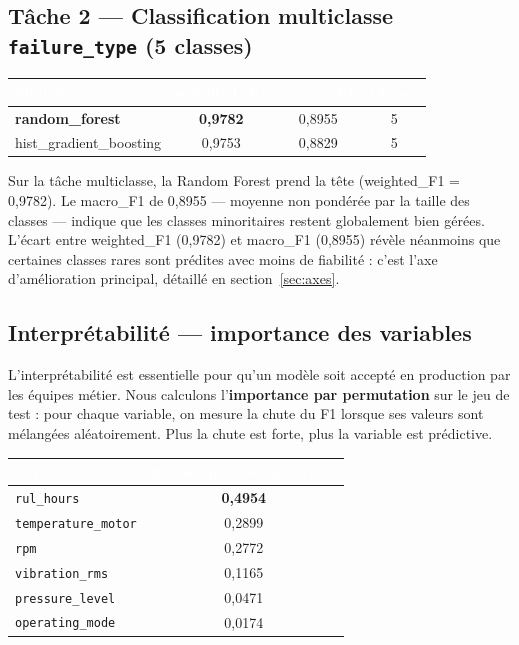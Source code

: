 \documentclass[11pt]{article}
\newcommand{\thead}[1]{\textbf{\textcolor{white}{#1}}}
\begin{document}
\subsection{Tâche 2 --- Classification multiclasse \texttt{failure\_type} (5 classes)}

\begin{center}
\begin{tabularx}{\linewidth}{|>{\raggedright\arraybackslash}X|c|c|c|}
\hline
\rowcolor{tableHeader}
\thead{Modèle} & \thead{weighted\_F1} & \thead{macro\_F1} & \thead{Classes} \\
\hline
\textbf{random\_forest} & \textbf{0,9782} & 0,8955 & 5 \\
\hline
hist\_gradient\_boosting & 0,9753 & 0,8829 & 5 \\
\hline
\end{tabularx}
\end{center}

Sur la tâche multiclasse, la Random Forest prend la tête (weighted\_F1 = 0,9782).
Le macro\_F1 de 0,8955 --- moyenne non pondérée par la taille des classes --- indique
que les classes minoritaires restent globalement bien gérées. L'écart entre
weighted\_F1 (0,9782) et macro\_F1 (0,8955) révèle néanmoins que certaines classes
rares sont prédites avec moins de fiabilité : c'est l'axe d'amélioration principal,
détaillé en section~\ref{sec:axes}.

\subsection{Interprétabilité --- importance des variables}

L'interprétabilité est essentielle pour qu'un modèle soit accepté en production par
les équipes métier. Nous calculons l'\textbf{importance par permutation} sur le jeu de
test : pour chaque variable, on mesure la chute du F1 lorsque ses valeurs sont
mélangées aléatoirement. Plus la chute est forte, plus la variable est prédictive.

\begin{center}
\begin{tabularx}{\linewidth}{|>{\raggedright\arraybackslash}X|c|}
\hline
\rowcolor{tableHeader}
\thead{Variable} & \thead{Importance (permutation)} \\
\hline
\texttt{rul\_hours} & \textbf{0,4954} \\
\hline
\texttt{temperature\_motor} & 0,2899 \\
\hline
\texttt{rpm} & 0,2772 \\
\hline
\texttt{vibration\_rms} & 0,1165 \\
\hline
\texttt{pressure\_level} & 0,0471 \\
\hline
\texttt{operating\_mode} & 0,0174 \\
\hline
\end{tabularx}
\end{center}
\end{document}

